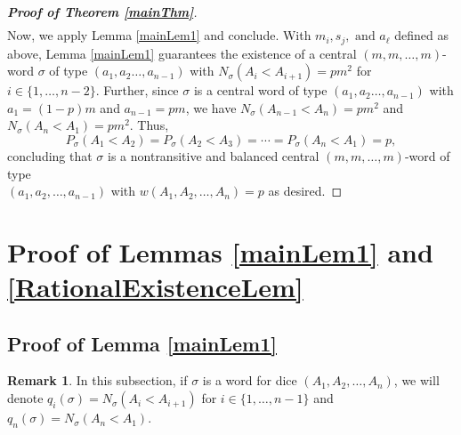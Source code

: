 \documentclass[11pt]{article}
\theoremstyle{definition}
\newtheorem*{remark}{Remark}
\begin{document}
\begin{proof}[\bf{Proof of Theorem \ref{mainThm}}]
\begin{align*}
    \end{align*}
    Now, we apply Lemma \ref{mainLem1} and conclude. With $m_i,s_j, \text{ and } a_\ell$ defined as above, Lemma \ref{mainLem1} guarantees the existence of a central $(m,m,\dots,m)$-word $\sigma$ of type $(a_1,a_2\dots,a_{n-1})$ with $N_\sigma(A_i < A_{i+1}) = pm^2$ for $i \in \{ 1,\dots,n-2\}$. Further, since $\sigma$ is a central word of type $(a_1,a_2\dots,a_{n-1})$ with $a_1=(1-p)m$ and $a_{n-1} = pm$, we have $N_\sigma(A_{n-1}<A_n) = pm^2$ and $N_\sigma(A_n<A_1) = pm^2$. Thus,
    $$P_\sigma(A_1<A_2) = P_\sigma(A_2<A_3) = \cdots = P_\sigma(A_n<A_1) = p,$$
    concluding that $\sigma$ is a nontransitive and balanced central $(m,m,\dots,m)$-word of type \\$(a_1,a_2,\dots,a_{n-1})$ with $w(A_1,A_2,\dots,A_n) = p$ as desired.
\end{proof}

\section{Proof of Lemmas \ref{mainLem1} and \ref{RationalExistenceLem}} \label{LemmaProofSection}


\subsection{Proof of Lemma \ref{mainLem1}}
\begin{remark}
    In this subsection, if $\sigma$ is a word for dice $(A_1,A_2,\dots,A_n)$, we will denote $q_i(\sigma) = N_\sigma(A_i<A_{i+1})$ for $i \in \{ 1,\dots, n-1\}$ and $q_n(\sigma) = N_\sigma(A_n<A_1)$.
\end{remark}
\end{document}
